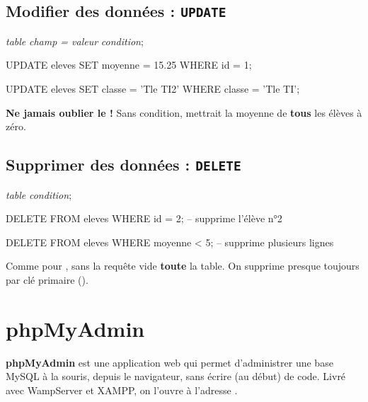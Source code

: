 \subsection{Modifier des données : \texttt{UPDATE}}

\begin{syntaxe}
 \textit{table}  \textit{champ = valeur}  \textit{condition};
\end{syntaxe}

\begin{codesql}
UPDATE eleves SET moyenne = 15.25 WHERE id = 1;

UPDATE eleves SET classe = 'Tle TI2' WHERE classe = 'Tle TI';
\end{codesql}

\begin{attention}
\textbf{Ne jamais oublier le  !} Sans condition,
 mettrait la moyenne de \textbf{tous} les
élèves à zéro.
\end{attention}

\subsection{Supprimer des données : \texttt{DELETE}}

\begin{syntaxe}
 \textit{table}  \textit{condition};
\end{syntaxe}

\begin{codesql}
DELETE FROM eleves WHERE id = 2;          -- supprime l'élève n°2

DELETE FROM eleves WHERE moyenne < 5;     -- supprime plusieurs lignes
\end{codesql}

\begin{attention}
Comme pour , sans  la requête 
vide \textbf{toute} la table. On supprime presque toujours par clé primaire
().
\end{attention}

\section{phpMyAdmin}

\begin{definition}
\textbf{phpMyAdmin} est une application web qui permet d'administrer une base
MySQL à la souris, depuis le navigateur, sans écrire (au début) de code. Livré
avec WampServer et XAMPP, on l'ouvre à l'adresse
.
\end{definition}

